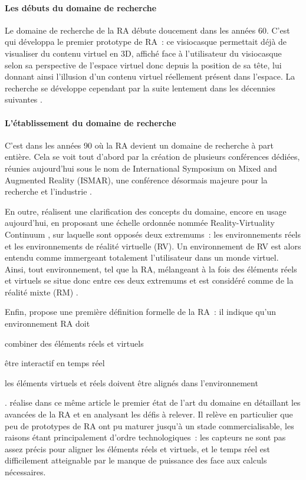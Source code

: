 \paragraph*{Les débuts du domaine de recherche}

Le domaine de recherche de la RA débute doucement dans les années 60. C'est \citet{Sutherland1968} qui développa le premier prototype de RA~: ce visiocasque permettait déjà de visualiser du contenu virtuel en 3D, affiché face à l'utilisateur du visiocasque selon sa perspective de l'espace virtuel donc depuis la position de sa tête, lui donnant ainsi l'illusion d'un contenu virtuel réellement présent dans l'espace. La recherche se développe cependant par la suite lentement dans les décennies suivantes \citep{VanKrevelenPoelman2010} \citep{CarmignianiFurhtAnisettiEtAl2011}.

\paragraph*{L'établissement du domaine de recherche}
C'est dans les années 90 où la RA devient un domaine de recherche à part entière. Cela se voit tout d'abord par la création de plusieurs conférences dédiées, réunies aujourd'hui sous le nom de International Symposium on Mixed and Augmented Reality (ISMAR), une conférence désormais majeure pour la recherche et l'industrie \citep{AzumaBaillotBehringerEtAl2001}.

En outre, \citet{MilgramKishino1994} réalisent une clarification des concepts du domaine, encore en usage aujourd'hui, en proposant une échelle ordonnée nommée \foreignlanguage{english}{Reality-Virtuality Continuum} , sur laquelle sont opposés deux extremums~: les environnements réels et les environnements de réalité virtuelle (RV). Un environnement de RV est alors entendu comme immergeant totalement l'utilisateur dans un monde virtuel. Ainsi, tout environnement, tel que la RA, mélangeant à la fois des éléments réels et virtuels se situe donc entre ces deux extremums et est considéré comme de la réalité mixte (RM) \citep{MilgramKishino1994}.

Enfin, \citet{Azuma1997} propose une première définition formelle de la RA~: il indique qu'un environnement RA doit 
\begin{enumerate*}[label=\emph{\arabic*})]
	\item combiner des éléments réels et virtuels
	\item être interactif en temps réel
	\item les éléments virtuels et réels doivent être alignés dans l'environnement
\end{enumerate*}. 
\citeauthor{Azuma1997} réalise dans ce même article le premier état de l'art du domaine en détaillant les avancées de la RA et en analysant les défis à relever. Il relève en particulier que peu de prototypes de RA ont pu maturer jusqu'à un stade commercialisable, les raisons étant principalement d'ordre technologiques~: les capteurs ne sont pas assez précis pour aligner les éléments réels et virtuels, et le temps réel est difficilement atteignable par le manque de puissance des face aux calculs nécessaires.

